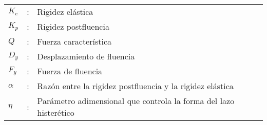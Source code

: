 \begin{tabular}{L{0.5 cm}p{0.025 cm}p{11.5 cm}}
	$K_{e}$  & : & Rigidez elástica                                                  \\
	$K_{p}$  & : & Rigidez postfluencia                                              \\
	$Q$      & : & Fuerza característica                                             \\
	$D_{y}$  & : & Desplazamiento de fluencia                                        \\
	$F_{y}$  & : & Fuerza de fluencia                                                \\
	$\alpha$ & : & Razón entre la rigidez postfluencia y la rigidez elástica         \\
	$\eta$   & : & Parámetro adimensional que controla la forma del lazo histerético \\
\end{tabular}\\



